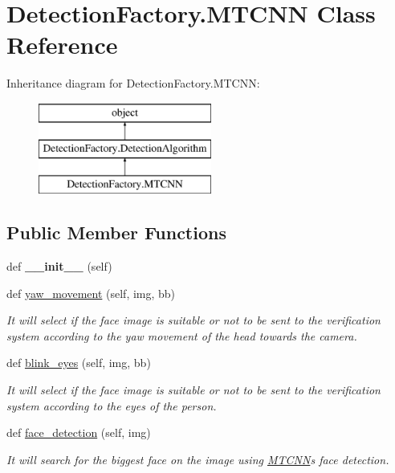 \hypertarget{classDetectionFactory_1_1MTCNN}{}\section{Detection\+Factory.\+M\+T\+C\+NN Class Reference}
\label{classDetectionFactory_1_1MTCNN}
Inheritance diagram for Detection\+Factory.\+M\+T\+C\+NN\+:\begin{figure}[H]
\begin{center}
\leavevmode
\includegraphics[height=3.000000cm]{classDetectionFactory_1_1MTCNN}
\end{center}
\end{figure}
\subsection*{Public Member Functions}
\begin{DoxyCompactItemize}
\item 
def {\bfseries \+\_\+\+\_\+init\+\_\+\+\_\+} (self)\hypertarget{classDetectionFactory_1_1MTCNN_abb5e3f6589b98423f5ea579a303c999b}{}\label{classDetectionFactory_1_1MTCNN_abb5e3f6589b98423f5ea579a303c999b}

\item 
def \hyperlink{classDetectionFactory_1_1MTCNN_ac7d884cb82b4ac91212453121238e641}{yaw\+\_\+movement} (self, img, bb)
\begin{DoxyCompactList}\small\item\em It will select if the face image is suitable or not to be sent to the verification system according to the yaw movement of the head towards the camera. \end{DoxyCompactList}\item 
def \hyperlink{classDetectionFactory_1_1MTCNN_a879b84b1ec40bdd68775e7f2368bb856}{blink\+\_\+eyes} (self, img, bb)
\begin{DoxyCompactList}\small\item\em It will select if the face image is suitable or not to be sent to the verification system according to the eyes of the person. \end{DoxyCompactList}\item 
def \hyperlink{classDetectionFactory_1_1MTCNN_a10083feb0513bee3bdffca54ca1596be}{face\+\_\+detection} (self, img)
\begin{DoxyCompactList}\small\item\em It will search for the biggest face on the image using \hyperlink{classDetectionFactory_1_1MTCNN}{M\+T\+C\+NN}\textquotesingle{}s face detection. \end{DoxyCompactList}\end{DoxyCompactItemize}
